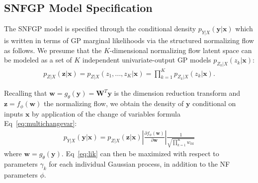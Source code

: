 \documentclass[letterpaper]{article} %
\begin{document}
\subsection{SNFGP Model Specification}
The SNFGP model is specified through the conditional density $p_{Y|X}(\mathbf{y}|\mathbf{x})$ which is written in terms of GP marginal likelihoods via the structured normalizing flow as follows.
We presume that the $K$-dimensional normalizing flow latent space can be modeled as a set of $K$ independent univariate-output GP models $p_{Z_k|X}(z_k | \mathbf{x})$:
\begin{align}
    p_{Z|X}(\mathbf{z} | \mathbf{x}) = p_{Z|X}(z_1, ..., z_K | \mathbf{x}) = \prod_{k=1}^K p_{Z_k|X}(z_k | \mathbf{x}).
\end{align}

Recalling that $\mathbf{w} = g_\theta(\mathbf{y}) = \mathbf{W}^T\mathbf{y}$ is the dimension reduction transform and $\mathbf{z} = f_\phi(\mathbf{w})$ the normalizing flow, we obtain the density of $\mathbf{y}$ conditional on inputs $\mathbf{x}$ by application of the change of variables formula Eq~\ref{eq:multichangevar}:
\begin{align}
    p_{Y|X}(\mathbf{y} | \mathbf{x}) = p_{Z|X}(\mathbf{z} | \mathbf{x}) \left| \frac{\partial f_\phi(\mathbf{w})}{\partial \mathbf{w}} \right|\frac{1}{\sqrt{\prod_{k=1}^K w_{kk} }} \label{eq:lik}
\end{align}
where $\mathbf{w} = g_\theta(\mathbf{y})$.
Eq~\ref{eq:lik} can then be maximized with respect to parameters $\gamma_k$ for each individual Gaussian process, in addition to the NF parameters $\phi$.
\end{document}
